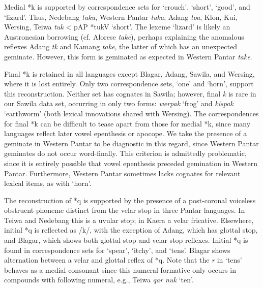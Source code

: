 Medial *k is supported by correspondence sets for {\textquoteleft}crouch{\textquoteright}, {\textquoteleft}short{\textquoteright}, {\textquoteleft}good{\textquoteright}, and {\textquoteleft}lizard{\textquoteright}. Thus, Nedebang \textit{tuku}, Western Pantar \textit{tuk{\textlengthmark}a}, Adang \textit{to{\textglotstop}a{\ng}}, Klon, Kui, Wersing, Teiwa \textit{tuk }{\textless} pAP *tukV {\textquoteleft}short{\textquoteright}. The lexeme {\textquoteleft}lizard{\textquoteright} is likely an Austronesian borrowing (cf. Alorese \textit{take}), perhaps explaining the anomalous reflexes Adang \textit{t{\textepsilon}k{\textopeno}} and Kamang \textit{tak{\textlengthmark}e{\textlengthmark}}, the latter of which has an unexpected geminate\textit{. }However, this form is geminated as expected in Western Pantar \textit{tak{\textlengthmark}e}.

Final *k is retained in all languages except Blagar, Adang, Sawila, and Wersing, where it is lost entirely. Only two correspondence sets, {\textquoteleft}one{\textquoteright} and {\textquoteleft}horn{\textquoteright}, support this reconstruction. Neither set has cognates in Sawila; however, final \textit{k }is rare in our Sawila data set, occurring in only two forms: \textit{werpa{\textlengthmark}k }{\textquoteleft}frog{\textquoteright} and \textit{kispa{\textlengthmark}k }{\textquoteleft}earthworm{\textquoteright} (both lexical innovations shared with Wersing). The correspondences for final *k can be difficult to tease apart from those for medial *k, since many languages reflect later vowel epenthesis or apocope. We take the presence of a geminate in Western Pantar to be diagnostic in this regard, since Western Pantar geminates do not occur word-finally. This criterion is admittedly problematic, since it is entirely possible that vowel epenthesis preceded gemination in Western Pantar. Furthermore, Western 
Pantar sometimes lacks cognates for relevant lexical items, as with {\textquoteleft}horn{\textquoteright}. 

The reconstruction of *q is supported by the presence of a post-coronal voiceless obstruent phoneme distinct from the velar stop in three Pantar languages. In Teiwa and Nedebang this is a uvular stop; in Kaera a velar fricative. Elsewhere, initial *q is reflected as /k/, with the exception of Adang, which has glottal stop, and Blagar, which shows both glottal stop and velar stop reflexes. Initial *q is found in correspondence sets for {\textquoteleft}spear{\textquoteright}, {\textquoteleft}itchy{\textquoteright}, and {\textquoteleft}tens{\textquoteright}. Blagar shows alternation between a velar and glottal reflex of *q. Note that the \textit{r} in {\textquoteleft}tens{\textquoteright} behaves as a medial consonant since this numeral formative only occurs in compounds with following numeral, e.g., Teiwa \textit{qar nuk} {\textquoteleft}ten{\textquoteright}. 

